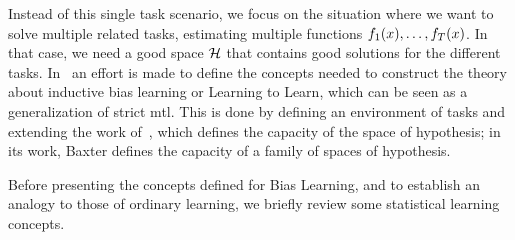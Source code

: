 Instead of this single task scenario, we focus on the situation where we want to solve multiple related tasks, estimating multiple functions $f_1(x), \ldots, f_T(x)$. In that case, we need a good space $\mathcal{H}$ that contains good solutions for the different tasks.
%
In~\cite{baxter2000model} an effort is made to define the concepts needed to construct the theory about inductive bias learning or Learning to Learn, which can be seen as a generalization of strict \acrshort{mtl}. This is done by defining an environment of tasks and extending the work of~\cite{Vapnik00}, which defines the capacity of the space of hypothesis; in its work, Baxter defines the capacity of a family of spaces of hypothesis.

Before presenting the concepts defined for Bias Learning, and to establish an analogy to those of ordinary learning, we briefly review some statistical learning concepts.

